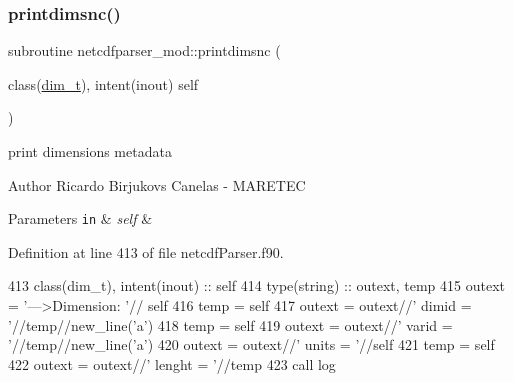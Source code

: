 \subsubsection{\texorpdfstring{printdimsnc()}{printdimsnc()}}
{\footnotesize\ttfamily subroutine netcdfparser\+\_\+mod\+::printdimsnc (\begin{DoxyParamCaption}\item[{class(\mbox{\hyperlink{structnetcdfparser__mod_1_1dim__t}{dim\+\_\+t}}), intent(inout)}]{self }\end{DoxyParamCaption})\hspace{0.3cm}{\ttfamily [private]}}



print dimensions metadata 

\begin{DoxyAuthor}{Author}
Ricardo Birjukovs Canelas -\/ M\+A\+R\+E\+T\+EC 
\end{DoxyAuthor}

\begin{DoxyParams}[1]{Parameters}
\mbox{\tt in}  & {\em self} & \\
\hline
\end{DoxyParams}


Definition at line 413 of file netcdf\+Parser.\+f90.


\begin{DoxyCode}
413     \textcolor{keywordtype}{class}(dim\_t), \textcolor{keywordtype}{intent(inout)} :: self
414     \textcolor{keywordtype}{type}(string) :: outext, temp
415     outext = \textcolor{stringliteral}{'--->Dimension: '}// self%
416     temp = self%
417     outext = outext//\textcolor{stringliteral}{'       dimid = '}//temp//new\_line(\textcolor{stringliteral}{'a'})
418     temp = self%
419     outext = outext//\textcolor{stringliteral}{'       varid = '}//temp//new\_line(\textcolor{stringliteral}{'a'})
420     outext = outext//\textcolor{stringliteral}{'       units = '}//self%
421     temp = self%
422     outext = outext//\textcolor{stringliteral}{'       lenght = '}//temp
423     \textcolor{keyword}{call }log%
\end{DoxyCode}
\mbox{\label{namespacenetcdfparser__mod_aeb48d33c014bae21b2fceaaa70cbdc67}} 
